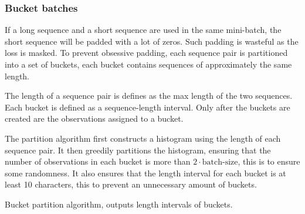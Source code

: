\subsubsection{Bucket batches}

If a long sequence and a short sequence are used in the same mini-batch, the short sequence will be padded with a lot of zeros. Such padding is wasteful as the loss is masked. To prevent obsessive padding, each sequence pair is partitioned into a set of buckets, each bucket contains sequences of approximately the same length.

The length of a sequence pair is defines as the max length of the two sequences. Each bucket is defined as a sequence-length interval. Only after the buckets are created are the observations assigned to a bucket.

The partition algorithm first constructs a histogram using the length of each sequence pair. It then greedily partitions the histogram, ensuring that the number of observations in each bucket is more than $2 \cdot \text{batch-size}$, this is to ensure some randomness. It also ensures that the length interval for each bucket is at least 10 characters, this to prevent an unnecessary amount of buckets.

\begin{algorithm}[H]
  \caption{Bucket partition algorithm, outputs length intervals of buckets.}
  \begin{algorithmic}[1]

         
         
        \Else
           \State {} 
            
        \EndIf
      \EndFor
      \State {}
    \EndFunction
  \end{algorithmic}
\end{algorithm}


